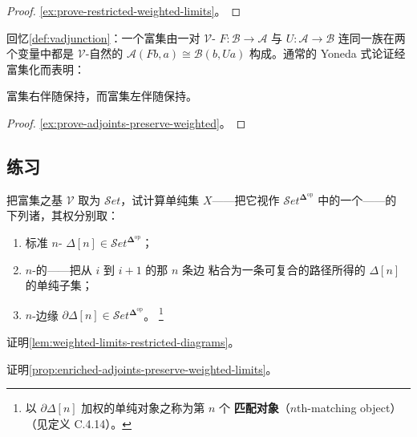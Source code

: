 \begin{proof}
\cref{ex:prove-restricted-weighted-limits}。
\end{proof}

回忆\cref{def:vadjunction}：一个富集\trAdjunction{}由一对 $\mathcal{V}$-%
\trFunctor{} $F\colon\mathcal{B}\to\mathcal{A}$ 与
$U\colon\mathcal{A}\to\mathcal{B}$ 连同一族在两个变量中都是 $\mathcal{V}$-自然的%
\trIsomorphism{} $\mathcal{A}(Fb,a)\cong\mathcal{B}(b,Ua)$ 构成。通常的
Yoneda 式论证经富集化而表明：

\begin{proposition}\label{prop:enriched-adjoints-preserve-weighted-limits}
富集右伴随保持\trWeightedLimit，而富集左伴随保持\trWeightedColimit。
\end{proposition}

\begin{proof}
\cref{ex:prove-adjoints-preserve-weighted}。
\end{proof}

\subsection*{练习}

\begin{exercise}\label{ex:weighted-limits-of-simplicial-set}
把富集之基 $\mathcal{V}$ 取为 $\mathcal{S}et$，试计算单纯集 $X$——把它视作
$\mathcal{S}et^{\boldsymbol{\Delta}^{\mathrm{op}}}$ 中的一个\trDiagram{}——的
下列诸\trWeightedLimit，其权分别取：
\begin{enumerate}[label=(\roman*)]
\item 标准 $n$-\trSimplex{}
  $\Delta[n]\in\mathcal{S}et^{\boldsymbol{\Delta}^{\mathrm{op}}}$；
\item $n$-\trSimplex{}的\textbf{\trSpine}——把从 $i$ 到 $i+1$ 的那 $n$ 条边
  粘合为一条可复合的路径所得的 $\Delta[n]$ 的单纯子集；
\item $n$-\trSimplex{}边缘
  $\partial\Delta[n]\in\mathcal{S}et^{\boldsymbol{\Delta}^{\mathrm{op}}}$。
  \footnote{以 $\partial\Delta[n]$ 加权的单纯对象之\trLimit{}称为第 $n$ 个%
  \textbf{匹配对象}（$n$th-matching object）（见定义 C.4.14）。}
\end{enumerate}
\end{exercise}

\begin{exercise}\label{ex:prove-restricted-weighted-limits}
证明\cref{lem:weighted-limits-restricted-diagrams}。
\end{exercise}

\begin{exercise}\label{ex:prove-adjoints-preserve-weighted}
证明\cref{prop:enriched-adjoints-preserve-weighted-limits}。
\end{exercise}


